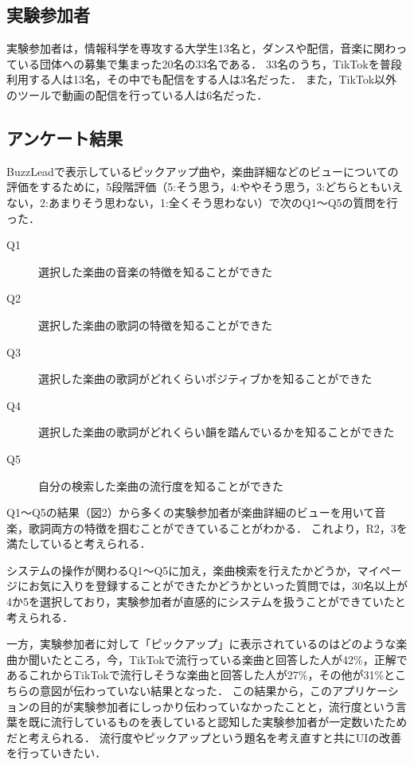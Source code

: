 \documentclass[titlepage]{jsreport}
\begin{document}
\subsection{実験参加者}
実験参加者は，情報科学を専攻する大学生13名と，ダンスや配信，音楽に関わっている団体への募集で集まった20名の33名である．
33名のうち，TikTokを普段利用する人は13名，その中でも配信をする人は3名だった．
また，TikTok以外のツールで動画の配信を行っている人は6名だった．

\subsection{アンケート結果}
BuzzLeadで表示しているピックアップ曲や，楽曲詳細などのビューについての評価をするために，5段階評価（5:そう思う，4:ややそう思う，3:どちらともいえない，2:あまりそう思わない，1:全くそう思わない）で次のQ1〜Q5の質問を行った．
\begin{description}
\item [Q1] 選択した楽曲の音楽の特徴を知ることができた
\item [Q2] 選択した楽曲の歌詞の特徴を知ることができた
\item [Q3] 選択した楽曲の歌詞がどれくらいポジティブかを知ることができた
\item [Q4] 選択した楽曲の歌詞がどれくらい韻を踏んでいるかを知ることができた
\item [Q5] 自分の検索した楽曲の流行度を知ることができた
\end{description}
Q1〜Q5の結果（図2）から多くの実験参加者が楽曲詳細のビューを用いて音楽，歌詞両方の特徴を掴むことができていることがわかる．
これより，R2，3を満たしていると考えられる．

システムの操作が関わるQ1〜Q5に加え，楽曲検索を行えたかどうか，マイページにお気に入りを登録することができたかどうかといった質問では，30名以上が4か5を選択しており，実験参加者が直感的にシステムを扱うことができていたと考えられる．

一方，実験参加者に対して「ピックアップ」に表示されているのはどのような楽曲か聞いたところ，今，TikTokで流行っている楽曲と回答した人が42\%，正解であるこれからTikTokで流行しそうな楽曲と回答した人が27\%，その他が31\%とこちらの意図が伝わっていない結果となった．
この結果から，このアプリケーションの目的が実験参加者にしっかり伝わっていなかったことと，流行度という言葉を既に流行しているものを表していると認知した実験参加者が一定数いたためだと考えられる．
流行度やピックアップという題名を考え直すと共にUIの改善を行っていきたい．
\end{document}
